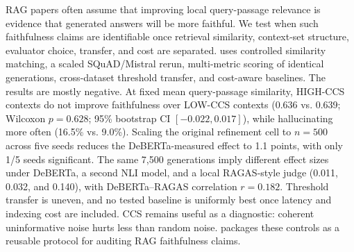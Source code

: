 RAG papers often assume that improving local query-passage relevance is
evidence that generated answers will be more faithful. We test when such
faithfulness claims are identifiable once retrieval similarity, context-set
structure, evaluator choice, transfer, and cost are separated. \method{} uses
controlled similarity matching, a scaled SQuAD/Mistral rerun, multi-metric
scoring of identical generations, cross-dataset threshold transfer, and
cost-aware baselines. The results are mostly negative. At fixed mean
query-passage similarity, HIGH-CCS contexts do not improve faithfulness over
LOW-CCS contexts (0.636 vs. 0.639; Wilcoxon $p=0.628$; 95\% bootstrap CI
$[-0.022,0.017]$), while hallucinating more often (16.5\% vs. 9.0\%). Scaling
the original refinement cell to $n=500$ across five seeds reduces the
DeBERTa-measured effect to 1.1 points, with only 1/5 seeds significant. The
same 7,500 generations imply different effect sizes under DeBERTa, a second
NLI model, and a local RAGAS-style judge (0.011, 0.032, and 0.140), with
DeBERTa--RAGAS correlation $r=0.182$. Threshold transfer is uneven, and no
tested baseline is uniformly best once latency and indexing cost are included. CCS remains
useful as a diagnostic: coherent uninformative noise hurts less than random
noise. \method{} packages these controls as a reusable protocol for auditing
RAG faithfulness claims.
